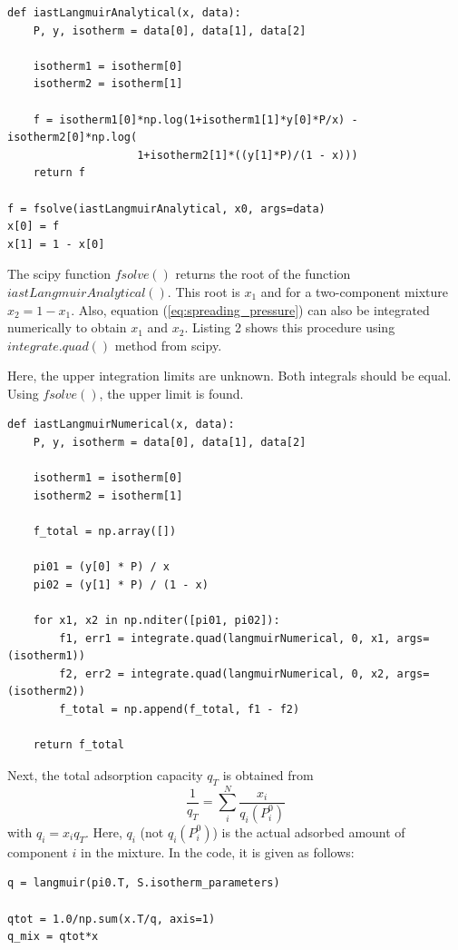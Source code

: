 \documentclass{article}
\begin{document}
\begin{lstlisting}[caption={Find root of equation (\ref{eq:find_root_analytical}) and obtain $x_1$ using analytical integrating of the Gibbs isotherm.}]
def iastLangmuirAnalytical(x, data):
    P, y, isotherm = data[0], data[1], data[2]

    isotherm1 = isotherm[0]
    isotherm2 = isotherm[1]

    f = isotherm1[0]*np.log(1+isotherm1[1]*y[0]*P/x) - isotherm2[0]*np.log(
                    1+isotherm2[1]*((y[1]*P)/(1 - x)))
    return f
   
f = fsolve(iastLangmuirAnalytical, x0, args=data)
x[0] = f
x[1] = 1 - x[0]
\end{lstlisting}

The scipy function $fsolve()$ returns the root of the function $iastLangmuirAnalytical()$. This root is $x_1$ and for a two-component mixture $x_2 = 1 - x_1$. Also, equation (\ref{eq:spreading_pressure}) can also be integrated numerically to obtain $x_1$ and $x_2$. Listing 2 shows this procedure using $integrate.quad()$ method from scipy.

Here, the upper integration limits are unknown. Both integrals should be equal. Using $fsolve()$, the upper limit is found.

\begin{lstlisting}[caption={Numerical integration of the Gibbs isotherm to obtain $x_1$ and $x_2$.}]
def iastLangmuirNumerical(x, data):
    P, y, isotherm = data[0], data[1], data[2]

    isotherm1 = isotherm[0]
    isotherm2 = isotherm[1]

    f_total = np.array([])

    pi01 = (y[0] * P) / x
    pi02 = (y[1] * P) / (1 - x)

    for x1, x2 in np.nditer([pi01, pi02]):
        f1, err1 = integrate.quad(langmuirNumerical, 0, x1, args=(isotherm1))
        f2, err2 = integrate.quad(langmuirNumerical, 0, x2, args=(isotherm2))
        f_total = np.append(f_total, f1 - f2)

    return f_total
\end{lstlisting}


Next, the total adsorption capacity $q_T$ is obtained from
%
\begin{equation}
        \frac{1}{q_T} = \sum_{i}^N\frac{x_i}{q_i(P_i^0)}
	\label{eq:total_adsorbed_loading}
\end{equation}
%
with $q_i={x_i}q_T$. Here, $q_i$ (not $q_i(P_i^0)$) is the actual adsorbed amount of component $i$ in the mixture. In the code, it is given as follows: 
%
\begin{lstlisting}[caption={Compute the mixture adsorption isotherms based on equation (\ref{eq:total_adsorbed_loading}).}]
q = langmuir(pi0.T, S.isotherm_parameters)

qtot = 1.0/np.sum(x.T/q, axis=1)
q_mix = qtot*x
\end{lstlisting}
%
\end{document}
